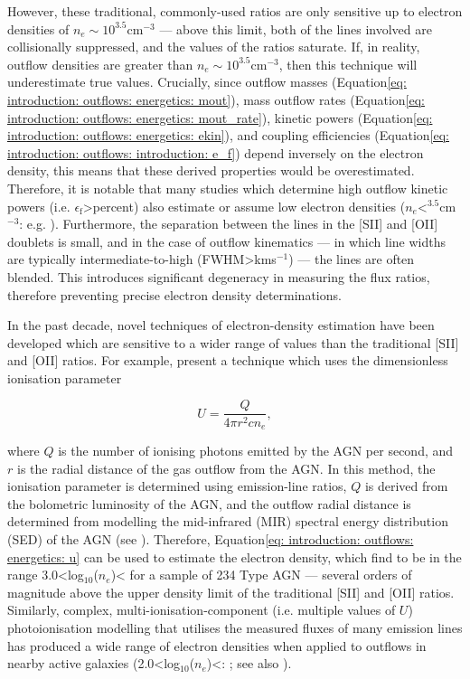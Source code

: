 However, these traditional, commonly-used ratios are only sensitive up to electron densities of $n_e\sim10^{3.5}$\;cm$^{-3}$ --- above this limit, both of the lines involved are collisionally suppressed, and the values of the ratios saturate. If, in reality, outflow densities are greater than $n_e\sim10^{3.5}$\;cm$^{-3}$, then this technique will underestimate true values. Crucially, since outflow masses (Equation\;\ref{eq: introduction: outflows: energetics: mout}), mass outflow rates (Equation\;\ref{eq: introduction: outflows: energetics: mout_rate}), kinetic powers (Equation\;\ref{eq: introduction: outflows: energetics: ekin}), and coupling efficiencies (Equation\;\ref{eq: introduction: outflows: introduction: e_f}) depend inversely on the electron density, this means that these derived properties would be overestimated. Therefore, it is notable that many studies which determine high outflow kinetic powers (i.e. $\epsilon_\mathrm{f}$\;\textgreater{}\;per\;cent) also estimate or assume low electron densities ($n_e$\;\textless{}$^{3.5}$\;cm$^{-3}$: e.g. \citealt{Kraemer2000II, Nesvadba2006, Harrison2014, Fiore2017}). Furthermore, the separation between the lines in the [SII] and [OII] doublets is small, and in the case of outflow kinematics --- in which line widths are typically intermediate-to-high (FWHM\;\textgreater{}\;km\;s$^{-1}$) --- the lines are often blended. This introduces significant degeneracy in measuring the flux ratios, therefore preventing precise electron density determinations.

In the past decade, novel techniques of electron-density estimation have been developed which are sensitive to a wider range of values than the traditional [SII] and [OII] ratios. For example, \citet{Baron2019b} present a technique which uses the dimensionless ionisation parameter

\begin{equation}
    U=\frac{Q}{4{\pi}r^2cn_e},
    \label{eq: introduction: outflows: energetics: u}
\end{equation}

\noindent
where $Q$ is the number of ionising photons emitted by the AGN per second, and $r$ is the radial distance of the gas outflow from the AGN. In this method, the ionisation parameter is determined using emission-line ratios, $Q$ is derived from the bolometric luminosity of the AGN, and the outflow radial distance is determined from modelling the mid-infrared (MIR) spectral energy distribution (SED) of the AGN (see \citealt{Baron2019a}). Therefore, Equation\;\ref{eq: introduction: outflows: energetics: u} can be used to estimate the electron density, which \citet{Baron2019b} find to be in the range 3.0\;\textless\;log$_{10}$($n_e$\;[cm$^{-3}$])\;\textless{} for a sample of 234 Type AGN --- several orders of magnitude above the upper density limit of the traditional [SII] and [OII] ratios. Similarly, complex, multi-ionisation-component (i.e. multiple values of $U$) photoionisation modelling that utilises the measured fluxes of many emission lines has produced a wide range of electron densities when applied to outflows in nearby active galaxies (2.0\;\textless\;log$_{10}$($n_e$\;[cm$^{-3}$])\;\textless{}: \citealt{Collins2009, Crenshaw2015, Revalski2021}; see also \citealt{Revalski2022}). 

